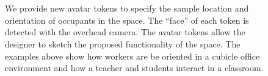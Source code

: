 \documentclass[10pt,twocolumn,letterpaper]{article}
\begin{document}
\begin{figure}[t]
\hfill%
\vspace{-2.49in}%
\\
\hspace*{1in} \hfill 
{}\\

\vspace{1.15in}
\caption{We provide new avatar tokens to specify the sample location
  and orientation of occupants in the space.  The ``face'' of each
  token is detected with the overhead camera.
The avatar tokens allow the designer to sketch the proposed
functionality of the space.  The examples above show how workers are
be oriented in a cubicle office environment and how a teacher and
students interact in a classroom.
}
\vspace{-0.15in}
\label{FIGURE:teaser}
\end{figure}
\end{document}
